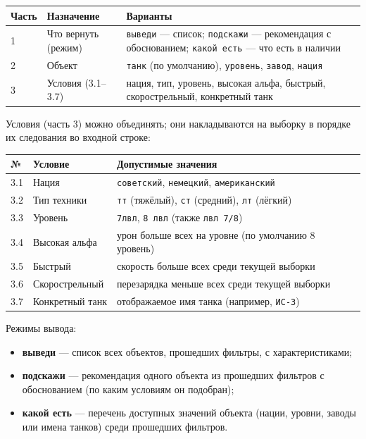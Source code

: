 \documentclass[12pt,a4paper]{article}
\begin{document}
\begin{center}
\begin{tabular}{lll}
\toprule
Часть & Назначение & Варианты \\
\midrule
1 & Что вернуть (режим) & \texttt{выведи} --- список; \texttt{подскажи} --- рекомендация с обоснованием; \texttt{какой есть} --- что есть в наличии \\
2 & Объект & \texttt{танк} (по умолчанию), \texttt{уровень}, \texttt{завод}, \texttt{нация} \\
3 & Условия (3.1--3.7) & нация, тип, уровень, высокая альфа, быстрый, скорострельный, конкретный танк \\
\bottomrule
\end{tabular}
\end{center}

Условия (часть 3) можно объединять; они накладываются на выборку в порядке их следования во входной строке:

\begin{center}
\begin{tabular}{lll}
\toprule
№ & Условие & Допустимые значения \\
\midrule
3.1 & Нация & \texttt{советский}, \texttt{немецкий}, \texttt{американский} \\
3.2 & Тип техники & \texttt{тт} (тяжёлый), \texttt{ст} (средний), \texttt{лт} (лёгкий) \\
3.3 & Уровень & \texttt{7лвл}, \texttt{8 лвл} (также \texttt{лвл 7/8}) \\
3.4 & Высокая альфа & урон больше всех на уровне (по умолчанию 8 уровень) \\
3.5 & Быстрый & скорость больше всех среди текущей выборки \\
3.6 & Скорострельный & перезарядка меньше всех среди текущей выборки \\
3.7 & Конкретный танк & отображаемое имя танка (например, \texttt{ИС-3}) \\
\bottomrule
\end{tabular}
\end{center}

Режимы вывода:
\begin{itemize}
\item \textbf{выведи} --- список всех объектов, прошедших фильтры, с характеристиками;
\item \textbf{подскажи} --- рекомендация одного объекта из прошедших фильтров с обоснованием (по каким условиям он подобран);
\item \textbf{какой есть} --- перечень доступных значений объекта (нации, уровни, заводы или имена танков) среди прошедших фильтров.
\end{itemize}
\end{document}
